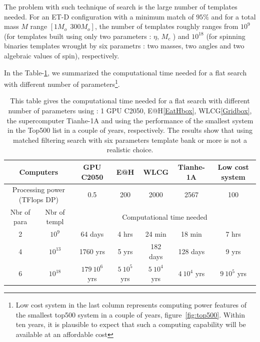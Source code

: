 The problem with such technique of search is the large number of templates needed. For an ET-D configuration with a minimum match  of $95\%$ and for a total mass $M$ range $\left[1 M_o~~300 M_o\right]$, the number of templates  roughly ranges from $10^9$ (for templates built using only two parameters : $\eta$, $M_c$ ) %
and $10^{18}$ (for spinning binaries  templates wrought by six parametrs : two masses, two angles and two algebraic values of spin), respectively.


In the  Table-\ref{comp.power}, we summarized the computational time needed for a flat search with different number of parameters\footnote{Low cost system in the last column represents computing power features of the smallest top500 system in a couple of years, figure~\ref{fig:top500}. Within ten years, it is  plausible to expect that such a computing capability will be available at an affordable cost}.
\begin{table}[h]
\begin{center}
\begin{tabular}{|c|c||c|c|c|c|c|} 
\hline

\multicolumn{2}{|c||}{Computers} &  GPU C2050 & E@H & WLCG &  Tianhe-1A & Low cost system\\ 
\hline
\multicolumn{2}{|c||}{Processing power (TFlops DP) } & 0.5 & 200 & 2000 &  2567 & 100 \\ 
\hline
 Nbr of para  & Nbr of templ   &  \multicolumn{5}{|c|}{Computational time needed} \\
 \hline
  2   &  $10^9$       & 64 days & 4 hrs  & 24 min   &  18 min  & 7 hrs   \\
 \hline
  4   &  $10^{13}$  & 1760 yrs & 5 yrs   & 182 days   &  128 days    &  9 yrs  \\ 
\hline
   6  &  $10^{18}$  & $179~10^6$ yrs &   $5~10^5$ yrs & $5~10^4$ yrs   & $4~10^4$ yrs  &  $9~10^5$ yrs   \\
\hline
\end{tabular}
\end{center}
\label{comp.power}
\caption{This table gives the computational time needed for a flat search with different number of parameters using : 1 GPU C2050, E@H\ref{EatHbox}, WLCG\ref{Gridbox}, the supercomputer Tianhe-1A and using the performance of the smallest system in the Top500 list in a couple of years, respectively. The results show that using matched filtering search with six parameters template bank or more is not a realistic choice.}
\end{table}


